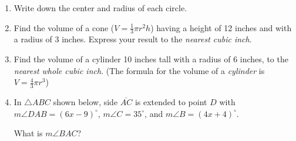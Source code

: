 \documentclass[12pt, twoside]{article}
\begin{document}
\begin{enumerate}
\item Write down the center and radius of each circle.
  \begin{enumerate}
  \end{enumerate}

\newpage
\item Find the volume of a cone ($V=\frac{1}{3}\pi r^2 h$) having a height of 12 inches and with a radius of 3 inches. Express your result to the \emph{nearest cubic inch}. \vspace{5cm}

\item Find the volume of a cylinder 10 inches tall with a radius of 6 inches, to the \emph{nearest whole cubic inch}. (The formula for the volume of a \emph{cylinder} is $V=\frac{4}{3}\pi r^3$)  \vspace{5cm}

\item In  $\triangle ABC$ shown below, side $\overline{AC}$ is extended to point $D$ with $m\angle DAB=(6x-9)^\circ$, $m\angle C=35^\circ$, and $m\angle B=(4x+4)^\circ$.
  \begin{center}
  \end{center}
  What is $m\angle BAC$?


\end{enumerate}
\end{document}
